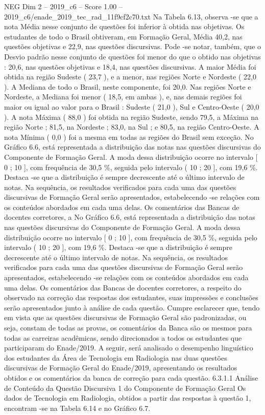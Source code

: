 \begin{textsample}{NEG Dim 2 – 2019\_c6 – Score 1.00 – 2019\_c6/enade\_2019\_tec\_rad\_11f9cf2c70.txt}
Na Tabela 6.13, observa -se que a nota Média nesse conjunto de questões foi inferior à obtida nas objetivas.
Os estudantes de todo o Brasil obtiveram, em Formação Geral, Média 40,2, nas questões objetivas e 22,9, nas questões discursivas.
Pode -se notar, também, que o Desvio padrão nesse conjunto de questões foi menor do que o obtido nas objetivas : 20,6, nas questões objetivas e 18,4, nas questões discursivas.
A maior Média foi obtida na região Sudeste ( 23,7 ), e a menor, nas regiões Norte e Nordeste ( 22,0 ).
A Mediana de todo o Brasil, neste componente, foi 20,0.
Nas regiões Norte e Nordeste, a Mediana foi menor ( 18,5, em ambas ), e, nas demais regiões foi maior ou igual ao valor para o Brasil : Sudeste ( 21,0 ), Sul e Centro-Oeste ( 20,0 ).
A nota Máxima ( 88,0 ) foi obtida na região Sudeste, sendo 79,5, a Máxima na região Norte ; 81,5, na Nordeste ; 83,0, na Sul ; e 80,5, na região Centro-Oeste.
A nota Mínima ( 0,0 ) foi a mesma em todas as regiões do Brasil sem exceção.
No Gráfico 6.6, está representada a distribuição das notas nas questões discursivas do Componente de Formação Geral.
A moda dessa distribuição ocorre no intervalo [ 0 ; 10 ], com frequência de 30,5 \%, seguida pelo intervalo ( 10 ; 20 ], com 19,6 \%.
Destaca -se que a distribuição é sempre decrescente até o último intervalo de notas.
Na sequência, os resultados verificados para cada uma das questões discursivas de Formação Geral serão apresentados, estabelecendo -se relações com os conteúdos abordados em cada uma delas.
Os comentários das Bancas de docentes corretores, a No Gráfico 6.6, está representada a distribuição das notas nas questões discursivas do Componente de Formação Geral.
A moda dessa distribuição ocorre no intervalo [ 0 ; 10 ], com frequência de 30,5 \%, seguida pelo intervalo ( 10 ; 20 ], com 19,6 \%.
Destaca -se que a distribuição é sempre decrescente até o último intervalo de notas.
Na sequência, os resultados verificados para cada uma das questões discursivas de Formação Geral serão apresentados, estabelecendo -se relações com os conteúdos abordados em cada uma delas.
Os comentários das Bancas de docentes corretores, a respeito do observado na correção das respostas dos estudantes, suas impressões e conclusões serão apresentados junto à análise de cada questão.
Cumpre esclarecer que, tendo em vista que as questões discursivas de Formação Geral são padronizadas, ou seja, constam de todas as provas, os comentários da Banca são os mesmos para todas as carreiras acadêmicas, sendo direcionados a todos os estudantes que participaram do Enade/2019.
A seguir, será analisado o desempenho linguístico dos estudantes da Área de Tecnologia em Radiologia nas duas questões discursivas de Formação Geral do Enade/2019, apresentando os resultados obtidos e os comentários da banca de correção para cada questão. 6.3.1.1 Análise de Conteúdo da Questão Discursiva 1 do Componente de Formação Geral Os dados de Tecnologia em Radiologia, obtidos a partir das respostas à questão 1, encontram -se na Tabela 6.14 e no Gráfico 6.7.

\end{textsample}
